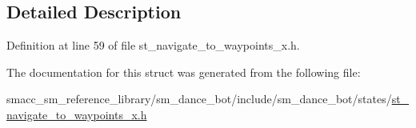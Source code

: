 \subsection{Detailed Description}


Definition at line 59 of file st\+\_\+navigate\+\_\+to\+\_\+waypoints\+\_\+x.\+h.



The documentation for this struct was generated from the following file\+:\begin{DoxyCompactItemize}
\item 
smacc\+\_\+sm\+\_\+reference\+\_\+library/sm\+\_\+dance\+\_\+bot/include/sm\+\_\+dance\+\_\+bot/states/\hyperlink{st__navigate__to__waypoints__x_8h}{st\+\_\+navigate\+\_\+to\+\_\+waypoints\+\_\+x.\+h}\end{DoxyCompactItemize}
